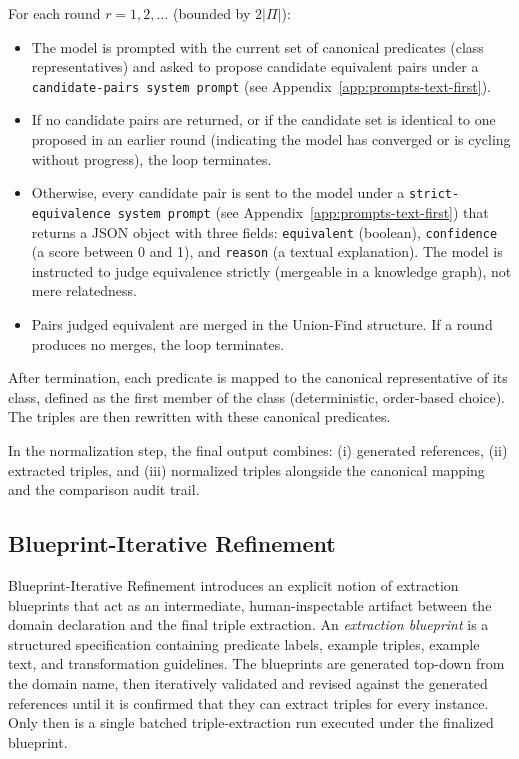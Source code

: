For each round $r = 1, 2, \dots$ (bounded by $2|\Pi|$):
\begin{itemize}
  \item The model is prompted with the current set of canonical predicates (class representatives) and asked to propose candidate equivalent pairs under a \texttt{candidate-pairs system prompt} (see Appendix~\ref{app:prompts-text-first}).
  \item If no candidate pairs are returned, or if the candidate set is identical to one proposed in an earlier round (indicating the model has converged or is cycling without progress), the loop terminates.
  \item Otherwise, every candidate pair is sent to the model under a \texttt{strict-equivalence system prompt} (see Appendix~\ref{app:prompts-text-first}) that returns a JSON object with three fields: \texttt{equivalent} (boolean), \texttt{confidence} (a score between 0 and 1), and \texttt{reason} (a textual explanation). The model is instructed to judge equivalence strictly (mergeable in a knowledge graph), not mere relatedness.
  \item Pairs judged equivalent are merged in the Union-Find structure. If a round produces no merges, the loop terminates.
\end{itemize}

After termination, each predicate is mapped to the canonical representative of its class, defined as the first member of the class (deterministic, order-based choice). The triples are then rewritten with these canonical predicates.

In the normalization step, the final output combines: (i) generated references, (ii) extracted triples, and (iii) normalized triples alongside the canonical mapping and the comparison audit trail.

\subsection{Blueprint-Iterative Refinement}

Blueprint-Iterative Refinement introduces an explicit notion of extraction blueprints that act as an intermediate, human-inspectable artifact between the domain declaration and the final triple extraction. An \emph{extraction blueprint} is a structured specification containing predicate labels, example triples, example text, and transformation guidelines. The blueprints are generated top-down from the domain name, then iteratively validated and revised against the generated references until it is confirmed that they can extract triples for every instance. Only then is a single batched triple-extraction run executed under the finalized blueprint.

